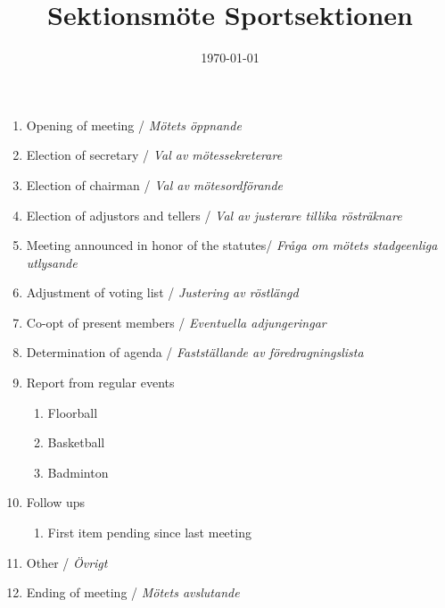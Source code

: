 \documentclass[12pt,a4paper]{article}
\begin{document}
	\title{\Huge Sektionsmöte Sportsektionen}
	\date{\today}
	\maketitle

	\null
	\vfill

	\clearpage

	\begin{enumerate}

		\item Opening of meeting / \emph{Mötets öppnande}
		\item Election of secretary / \emph{Val av mötessekreterare}
		\item Election of chairman / \emph{Val av mötesordförande}
		\item Election of adjustors and tellers / \emph{Val av justerare tillika rösträknare}
		\item Meeting announced in honor of the statutes/ \emph{Fråga om mötets stadgeenliga utlysande}
		\item Adjustment of voting list / \emph{Justering av röstlängd}
		\item Co-opt of present members / \emph{Eventuella adjungeringar}
		\item Determination of agenda / \emph{Fastställande av föredragningslista}
		\item Report from regular events
		\begin{enumerate}
			\item Floorball
			\item Basketball
			\item Badminton
		\end{enumerate}
		\item Follow ups %
		\begin{enumerate}
			\item First item pending since last meeting
		\end{enumerate}
		\item Other / \emph{Övrigt}
		\item Ending of meeting / \emph{Mötets avslutande}
	\end{enumerate}
\end{document}

